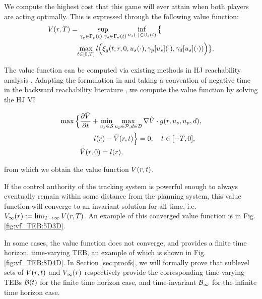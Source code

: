 We compute the highest cost that this game will ever attain when both players are acting optimally. 
This is expressed through the following value function:
\begin{align}
&V(\rstate,\thor)= \sup_{\gamma_{\pstate} \in \Gamma_\pstate(t), \gamma_{\dstb} \in \Gamma_\dstb(t)} \inf_{\tctrl(\cdot) \in \tcfset(t)} \big\{ \nonumber \\
&\qquad\qquad \max_{\tvar\in [0, \thor]} \errfunc\Big(\rtraj(\tvar; \rstate, 0, \tctrl(\cdot), \gamma_\pstate[\tctrl](\cdot), \gamma_\dstb[\tctrl](\cdot))\Big)\big\}. \label{eq:valfunc}
\end{align} 

The value function can be computed via existing methods in HJ reachability analysis \cite{Mitchell05, Fisac15}.
Adapting the formulation in \cite{Fisac15} and taking a convention of negative time in the backward reachability literature \cite{Chen2016DecouplingJournal, Chen2018}, we compute the value function by solving the HJ VI

\begin{align}
\max \Big\{&\frac{\partial \tilde\valfunc}{\partial \tvar} + \min_{\tctrl\in\tset} \max_{\pctrl\in\pset, \dstb\in\dset} \nabla \tilde\valfunc \cdot \rdyn(\rstate, \tctrl, \pctrl, \dstb), \nonumber \\
&\qquad\errfunc(\rstate) - \tilde\valfunc(\rstate, \tvar)\Big\} = 0, \quad \tvar \in [-T, 0], \label{eq:HJVI} \\
&\tilde\valfunc(\rstate, 0) = \errfunc(\rstate), \nonumber
\end{align}

\noindent from which we obtain the value function $V(r, t)$.


If the control authority of the tracking system is powerful enough to always eventually remain within some distance from the planning system, this value function will converge to an invariant solution for all time, i.e. $V_\infty(r) := \lim_{T\rightarrow\infty} V(r, T)$. 
An example of this converged value function is in Fig. \ref{fig:vf_TEB:5D3D}. 

In some cases, the value function does not converge, and provides a finite time horizon, time-varying TEB, an example of which is shown in Fig. \ref{fig:vf_TEB:8D4D}.
In Section \ref{sec:proofs}, we will formally prove that sublevel sets of $V(r,t)$ and $V_\infty(r)$ respectively provide the corresponding time-varying TEBs $\mathcal B(t)$ for the finite time horizon case, and time-invariant $\mathcal B_\infty$ for the infinite time horizon case.
 

